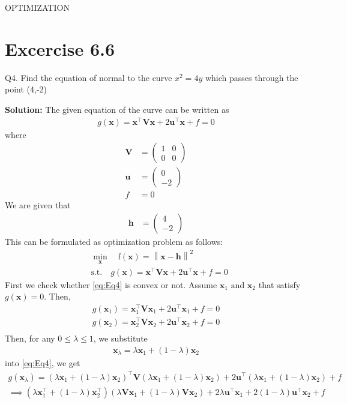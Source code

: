 \documentclass[12pt]{article}
\providecommand{\brak}[1]{\ensuremath{\left(#1\right)}}
\providecommand{\norm}[1]{\left\lVert#1\right\rVert}
\newcommand{\solution}{\noindent \textbf{Solution: }}
\newcommand{\myvec}[1]{\ensuremath{\begin{pmatrix}#1\end{pmatrix}}}
\let\vec\mathbf
\begin{document}
\begin{center}
\textbf\large{OPTIMIZATION}

\end{center}
\section*{Excercise 6.6}

Q4. Find the equation of normal to the curve $x^2=4y$ which passes through the point (4,-2)

\solution
The given equation of the curve can be written as  
\begin{align}
	\label{eq:parabolaEq2}
	g\brak{\vec{x}} = \vec{x}^\top\vec{V}\vec{x} + 2\vec{u}^\top\vec{x} + f = 0 
\end{align}
where
\begin{align}
	\label{eq:eqV}
	\vec{V} &= \myvec{ 1 & 0 \\ 0 & 0} \\
	\label{eq:eqU}
	\vec{u} &= \myvec{0 \\ -2} \\
	\label{eq:eqF}
	f &= 0 
\end{align}
We are given that 
\begin{align}
	\vec{h} &= \myvec{4 \\ -2}
\end{align}
This can be formulated as optimization problem as follows:
\begin{align}
	\label{eq:Eq3}
	&  \min_{\vec{x}} \quad \text{f}\brak{\vec{x}} = \norm{\vec{x}-\vec{h}}^2\\
	\label{eq:Eq4}
	& \text{s.t.}\quad g\brak{\vec{x}} = \vec{x}^\top\vec{V}\vec{x} + 2\vec{u}^\top\vec{x} + f = 0  
\end{align}
First we check whether \eqref{eq:Eq4} is convex or not. Assume $\vec{x}_1 \text{ and } \vec{x}_2$ that satisfy $g\brak{\vec{x}}=0$. Then,
\begin{align}
	\label{eq:eq5}
	g\brak{\vec{x}_1} = \vec{x}_1^\top\vec{V}\vec{x}_1+2\vec{u}^\top\vec{x}_1+f=0\\
	\label{eq:eq6}
	g\brak{\vec{x}_2} = \vec{x}_2^\top\vec{V}\vec{x}_2+2\vec{u}^\top\vec{x}_2+f=0\\
\end{align}
Then, for any $0\le\lambda\le1$, we substitute
\begin{align}
	\vec{x}_\lambda = \lambda\vec{x}_1+\brak{1-\lambda}\vec{x}_2
\end{align}
into \eqref{eq:Eq4}, we get
\begin{align}
        \label{eq:Eq5}
	g\brak{\vec{x}_\lambda} = \brak{\lambda\vec{x}_1+\brak{1-\lambda}\vec{x}_2}^\top\vec{V} \brak{\lambda\vec{x}_1+\brak{1-\lambda}\vec{x}_2} + 2\vec{u}^\top\brak{\lambda\vec{x}_1+\brak{1-\lambda}\vec{x}_2} +f \\
	\implies 
	\brak{\lambda\vec{x}_1^\top+\brak{1-\lambda}\vec{x}_2^\top}\brak{\lambda\vec{V}\vec{x}_1+\brak{1-\lambda}\vec{V}\vec{x}_2}+2\lambda\vec{u}^\top\vec{x}_1+2\brak{1-\lambda}\vec{u}^\top\vec{x}_2 +f
\end{align}
\end{document}

